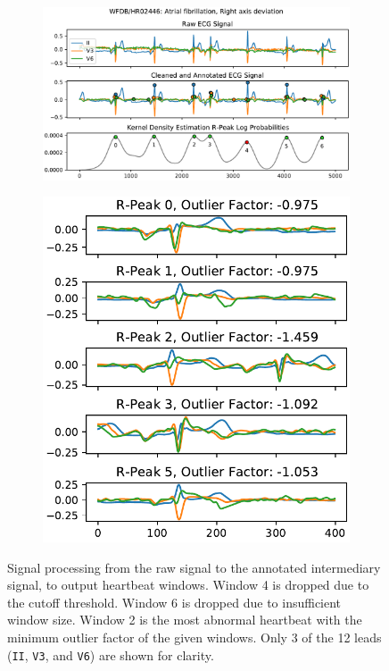 \documentclass[\main/thesis.tex]{subfiles}
\begin{document}
\begin{figure}[tp]
    \begin{subfigure}[b]{0.66\textwidth}
        \centering
        \includegraphics[width=\textwidth]{figure/aenc_3_sig_raw_clean_peaks.pdf}
    \end{subfigure}
    \begin{subfigure}[b]{0.33\textwidth}
        \centering
        \includegraphics[width=\textwidth]{figure/aenc_3_sig_r_peak_windows.pdf}
    \end{subfigure}
    \caption{Signal processing from the raw signal to the annotated intermediary signal, to output heartbeat windows. Window 4 is dropped due to the cutoff threshold. Window 6 is dropped due to insufficient window size. Window 2 is the most abnormal heartbeat with the minimum outlier factor of the given windows. Only 3 of the 12 leads (\texttt{II}, \texttt{V3}, and \texttt{V6}) are shown for clarity.}
    \label{fig:signal_preprocessing}
\end{figure}
\end{document}
